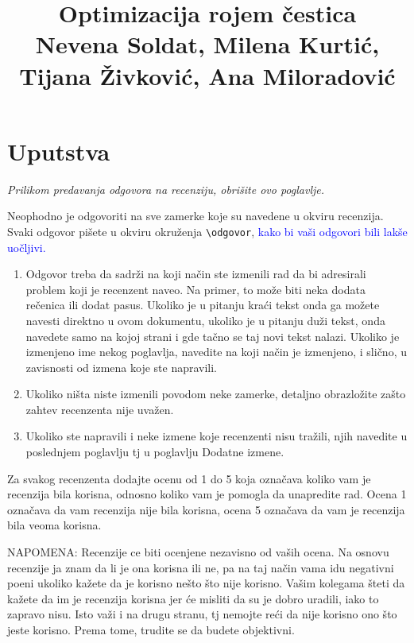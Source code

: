 \documentclass[a4paper]{report}
\newcommand{\odgovor}[1]{\textcolor{blue}{#1}}
\begin{document}
\title{Optimizacija rojem čestica\\ \small{Nevena Soldat, Milena Kurtić, Tijana Živković, Ana Miloradović}}

\maketitle

\tableofcontents

\chapter{Uputstva}
\emph{Prilikom predavanja odgovora na recenziju, obrišite ovo poglavlje.}

Neophodno je odgovoriti na sve zamerke koje su navedene u okviru recenzija. Svaki odgovor pišete u okviru okruženja \verb"\odgovor", \odgovor{kako bi vaši odgovori bili lakše uočljivi.} 
\begin{enumerate}

\item Odgovor treba da sadrži na koji način ste izmenili rad da bi adresirali problem koji je recenzent naveo. Na primer, to može biti neka dodata rečenica ili dodat pasus. Ukoliko je u pitanju kraći tekst onda ga možete navesti direktno u ovom dokumentu, ukoliko je u pitanju duži tekst, onda navedete samo na kojoj strani i gde tačno se taj novi tekst nalazi. Ukoliko je izmenjeno ime nekog poglavlja, navedite na koji način je izmenjeno, i slično, u zavisnosti od izmena koje ste napravili. 

\item Ukoliko ništa niste izmenili povodom neke zamerke, detaljno obrazložite zašto zahtev recenzenta nije uvažen.

\item Ukoliko ste napravili i neke izmene koje recenzenti nisu tražili, njih navedite u poslednjem poglavlju tj u poglavlju Dodatne izmene.
\end{enumerate}

Za svakog recenzenta dodajte ocenu od 1 do 5 koja označava koliko vam je recenzija bila korisna, odnosno koliko vam je pomogla da unapredite rad. Ocena 1 označava da vam recenzija nije bila korisna, ocena 5 označava da vam je recenzija bila veoma korisna. 

NAPOMENA: Recenzije ce biti ocenjene nezavisno od vaših ocena. Na osnovu recenzije ja znam da li je ona korisna ili ne, pa na taj način vama idu negativni poeni ukoliko kažete da je korisno nešto što nije korisno. Vašim kolegama šteti da kažete da im je recenzija korisna jer će misliti da su je dobro uradili, iako to zapravo nisu. Isto važi i na drugu stranu, tj nemojte reći da nije korisno ono što jeste korisno. Prema tome, trudite se da budete objektivni. 
\end{document}
